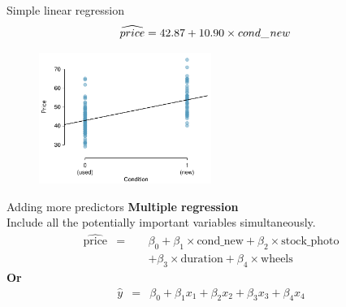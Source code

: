 \documentclass[12pt,a4paper]{beamer}
\begin{document}
\begin{frame}{Simple linear regression}
	\begin{align*}
	\widehat{price} &= 42.87 + 10.90\times cond\_\hspace{0.3mm}new
	\end{align*}
	
	\begin{table}[ht]
		
	
	\end{table}

	\begin{figure}
	\centering
	\includegraphics[width=0.5\textwidth]{figures/marioKartSingle/marioKartSingle}
	\end{figure}
\end{frame}
\begin{frame}{Adding more predictors}
	\textbf{Multiple regression}\\
	Include all the potentially important variables simultaneously.
	\begin{eqnarray*}
	\widehat{\text{price}}
		&=& \beta_0 + \beta_1\times \text{cond\_new} +
			\beta_2\times \text{stock\_ photo}  \\
		&\qquad&  + \beta_3 \times  \text{duration} +
			\beta_4 \times  \text{wheels} 
		\end{eqnarray*}
		\textbf{Or}
		\begin{eqnarray*}
	\hat{y} &=& \beta_0 + \beta_1 x_1 + \beta_2 x_2 +
			\beta_3 x_3 + \beta_4 x_4
		\end{eqnarray*}
		\end{frame}
\end{document}
